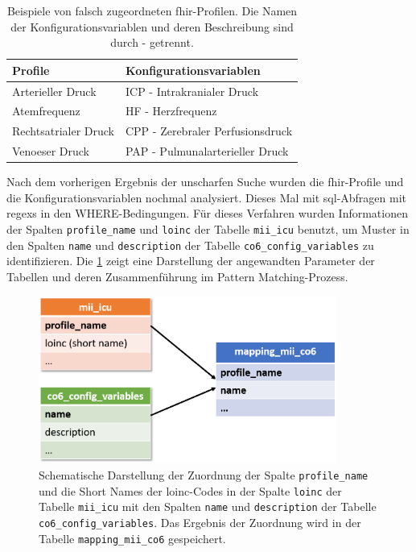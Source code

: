 \clearpage

\begin{table}[ht]
	\centering 
	\caption[Beispiele von falsch zugeordneten \acs{fhir}-Profilen]{Beispiele von falsch zugeordneten \acs{fhir}-Profilen. Die Namen der Konfigurationsvariablen und deren Beschreibung sind durch \glqq-\grqq{} getrennt.}
	\label{tab:wrongpaar}
	\begin{tabular}{|l|l|}
		\hline
		\bfseries Profile & \bfseries Konfigurationsvariablen \\ \hline
		Arterieller Druck & ICP - Intrakranialer Druck \\ \hline
		Atemfrequenz & HF - Herzfrequenz \\ \hline
        Rechtsatrialer Druck & CPP - Zerebraler Perfusionsdruck \\ \hline
        Venoeser Druck & PAP - Pulmunalarterieller Druck \\ \hline
	\end{tabular}
\end{table}

Nach dem vorherigen Ergebnis der unscharfen Suche wurden die \ac{fhir}-Profile und die Konfigurationsvariablen nochmal analysiert. Dieses Mal mit \ac{sql}-Abfragen mit \acp{regex} in den WHERE-Bedingungen. Für dieses Verfahren wurden Informationen der Spalten \texttt{profile\_name} und \texttt{loinc} der Tabelle \texttt{mii\_icu} benutzt, um Muster in den Spalten \texttt{name} und \texttt{description} der Tabelle \texttt{co6\_config\_variables} zu identifizieren. Die \ref{fig:mapping} zeigt eine Darstellung der angewandten Parameter der Tabellen und deren Zusammenführung im Pattern Matching-Prozess.


\begin{figure}[ht]
	\centering
	\includegraphics[height=5.5cm]{figures/mapping}
	\caption[Zuordnung der Konfigurationsvariablen mit den \acs{fhir}-Profilen]{Schematische Darstellung der Zuordnung der Spalte \texttt{profile\_name} und die \glqq Short Names\grqq{} der \acs{loinc}-Codes in der Spalte \texttt{loinc} der Tabelle \texttt{mii\_icu} mit den Spalten \texttt{name} und \texttt{description} der Tabelle \texttt{co6\_config\_variables}. Das Ergebnis der Zuordnung wird in der Tabelle \texttt{mapping\_mii\_co6} gespeichert.}
	\label{fig:mapping}
\end{figure}

